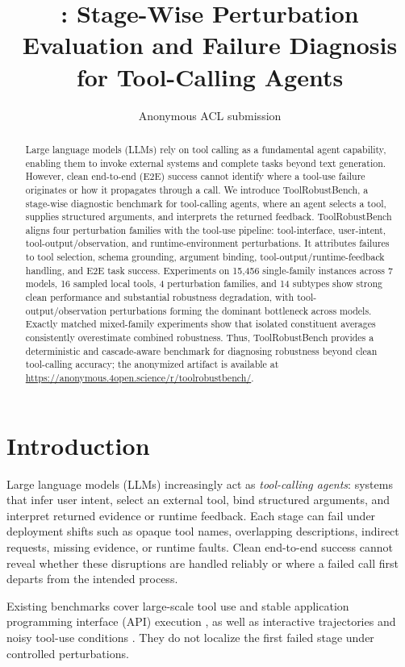 \documentclass[11pt]{article}
\title{\ToolRobustBench: Stage-Wise Perturbation Evaluation and Failure Diagnosis for Tool-Calling Agents}
\author{Anonymous ACL submission}
\newcommand{\ToolRobustBench}{ToolRobustBench\xspace}
\begin{document}
\maketitle

\begin{abstract}
Large language models (LLMs) rely on tool calling as a fundamental agent capability, enabling them to invoke external systems and complete tasks beyond text generation. However, clean end-to-end (E2E) success cannot identify where a tool-use failure originates or how it propagates through a call. We introduce \ToolRobustBench, a stage-wise diagnostic benchmark for tool-calling agents, where an agent selects a tool, supplies structured arguments, and interprets the returned feedback. \ToolRobustBench aligns four perturbation families with the tool-use pipeline: tool-interface, user-intent, tool-output/observation, and runtime-environment perturbations. It attributes failures to tool selection, schema grounding, argument binding, tool-output/runtime-feedback handling, and E2E task success. Experiments on 15,456 single-family instances across 7 models, 16 sampled local tools, 4 perturbation families, and 14 subtypes show strong clean performance and substantial robustness degradation, with tool-output/observation perturbations forming the dominant bottleneck across models. Exactly matched mixed-family experiments show that isolated constituent averages consistently overestimate combined robustness. Thus, \ToolRobustBench provides a deterministic and cascade-aware benchmark for diagnosing robustness beyond clean tool-calling accuracy; the anonymized artifact is available at \url{https://anonymous.4open.science/r/toolrobustbench/}.
\end{abstract}

\section{Introduction}

Large language models (LLMs) increasingly act as \emph{tool-calling agents}: systems that infer user intent, select an external tool, bind structured arguments, and interpret returned evidence or runtime feedback. Each stage can fail under deployment shifts such as opaque tool names, overlapping descriptions, indirect requests, missing evidence, or runtime faults. Clean end-to-end success cannot reveal whether these disruptions are handled reliably or where a failed call first departs from the intended process.

Existing benchmarks cover large-scale tool use and stable application programming interface (API) execution \citep{qin2024toolllm,guo2024stabletoolbench}, as well as interactive trajectories and noisy tool-use conditions \citep{lu2025toolsandbox,wang2026agentnoisebench}. They do not localize the first failed stage under controlled perturbations.
\end{document}
